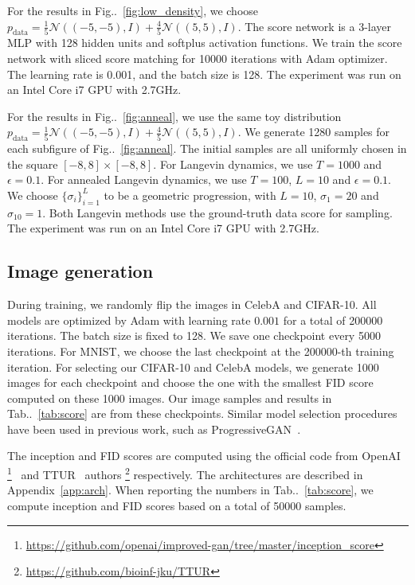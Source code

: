 \documentclass{article}
\makeatletter
\newcommand{\mcal}{\mathcal}
\def\@onedot{\ifx\@let@token.\else.\null\fi\xspace}
\DeclareRobustCommand\onedot{\futurelet\@let@token\@onedot}
\newcommand{\figref}[1]{Fig\onedot~\ref{#1}}
\newcommand{\tabref}[1]{Tab\onedot~\ref{#1}}
\makeatother
\begin{document}
For the results in \figref{fig:low_density}, we choose $p_\text{data}=\frac{1}{5}\mcal{N}((-5,-5), I) + \frac{4}{5}\mcal{N}((5,5), I)$. The score network is a 3-layer MLP with 128 hidden units and softplus activation functions. We train the score network with sliced score matching for 10000 iterations with Adam optimizer. The learning rate is 0.001, and the batch size is 128. The experiment was run on an Intel Core i7 GPU with 2.7GHz.

For the results in \figref{fig:anneal}, we use the same toy distribution $p_\text{data}=\frac{1}{5}\mcal{N}((-5,-5), I) + \frac{4}{5}\mcal{N}((5,5), I)$. We generate 1280 samples for each subfigure of \figref{fig:anneal}. The initial samples are all uniformly chosen in the square $[-8,8] \times [-8,8]$. For Langevin dynamics, we use $T = 1000$ and $\epsilon = 0.1$. For annealed Langevin dynamics, we use $T=100$, $L=10$ and $\epsilon = 0.1$. We choose $\{\sigma_i\}_{i=1}^L$ to be a geometric progression, with $L=10$, $\sigma_1 = 20$ and $\sigma_{10} = 1$. Both Langevin methods use the ground-truth data score for sampling. The experiment was run on an Intel Core i7 GPU with 2.7GHz.

\subsection{Image generation}
During training, we randomly flip the images in CelebA and CIFAR-10. All models are optimized by Adam with learning rate $0.001$ for a total of 200000 iterations. The batch size is fixed to 128. We save one checkpoint every 5000 iterations. For MNIST, we choose the last checkpoint at the 200000-th training iteration. For selecting our CIFAR-10 and CelebA models, we generate 1000 images for each checkpoint and choose the one with the smallest FID score computed on these 1000 images. Our image samples and results in \tabref{tab:score} are from these checkpoints. Similar model selection procedures have been used in previous work, such as ProgressiveGAN~\cite{karras2018progressive}.

The inception and FID scores are computed using the official code from OpenAI \footnote{\href{https://github.com/openai/improved-gan/tree/master/inception_score}{\color{cyan}https://github.com/openai/improved-gan/tree/master/inception\_score}}~\cite{salimans2016improved} and TTUR~\cite{heusel2017gans} authors \footnote{\href{https://github.com/bioinf-jku/TTUR}{\color{cyan}https://github.com/bioinf-jku/TTUR}} respectively. The architectures are described in Appendix~\ref{app:arch}. When reporting the numbers in \tabref{tab:score}, we compute inception and FID scores based on a total of 50000 samples.
\end{document}
